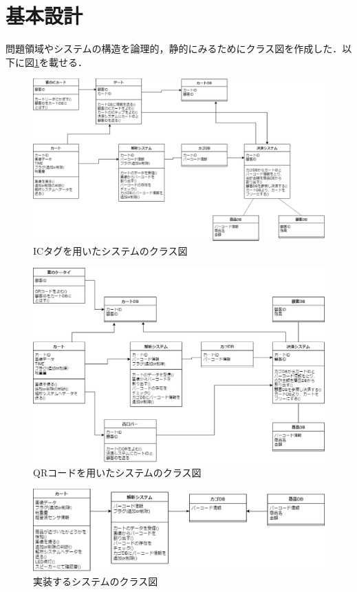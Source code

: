 


\section{基本設計}

問題領域やシステムの構造を論理的，静的にみるためにクラス図を作成した．以下に図\ref{class_ic}を載せる．

\begin{figure}[htbp]
\centering
\includegraphics[width=15cm]{./picture/class_ic.eps}
\caption{ICタグを用いたシステムのクラス図}
\label{class_ic}
\end{figure}

\begin{figure}[htbp]
\centering
\includegraphics[width=15cm]{./picture/class_qr.eps}
\caption{QRコードを用いたシステムのクラス図}
\label{class_qr}
\end{figure}

\begin{figure}[htbp]
\centering
\includegraphics[width=15cm]{./picture/class_qr_2.eps}
\caption{実装するシステムのクラス図}
\label{class_qr_2}
\end{figure}